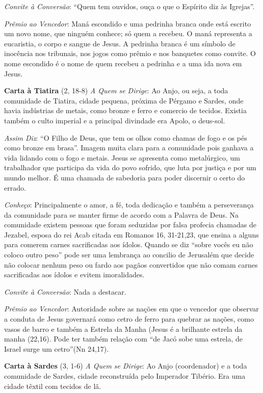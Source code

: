 \documentclass[
]{book}
\begin{document}
\emph{Convite à Conversão}: ``Quem tem ouvidos, ouça o que o Espírito diz às Igrejas''.

\emph{Prêmio ao Vencedor}: Maná escondido e uma pedrinha branca onde está escrito um novo nome, que ninguém conhece; só quem a recebeu. O maná representa a eucaristia, o corpo e sangue de Jesus. A pedrinha branca é um símbolo de inocência nos tribunais, nos jogos como prêmio e nos banquetes como convite. O nome escondido é o nome de quem recebeu a pedrinha e a uma ida nova em Jesus.

\textbf{Carta à Tiatira} (2, 18-8)
\emph{A Quem se Dirige}: Ao Anjo, ou seja, a toda comunidade de Tiatira, cidade pequena, próxima de Pérgamo e Sardes, onde havia indústrias de metais, como bronze e ferro e comercio de tecidos. Existia também o culto imperial e a principal divindade era Apolo, o deus-sol.

\emph{Assim Diz}: ``O Filho de Deus, que tem os olhos como chamas de fogo e os pés como bronze em brasa''. Imagem muita clara para a comunidade pois ganhava a vida lidando com o fogo e metais. Jesus se apresenta como metalúrgico, um trabalhador que participa da vida do povo sofrido, que luta por justiça e por um mundo melhor. É uma chamada de sabedoria para poder discernir o certo do errado.

\emph{Conheço}: Principalmente o amor, a fé, toda dedicação e também a perseverança da comunidade para se manter firme de acordo com a Palavra de Deus. Na comunidade existem pessoas que foram seduzidas por falsa profecia chamadas de Jezabel, esposa do rei Acab citada em Romanos 16, 31-21,23, que ensina a alguns para comerem carnes sacrificadas aos ídolos. Quando se diz ``sobre vocês eu não coloco outro peso'' pode ser uma lembrança ao concilio de Jerusalém que decide não colocar nenhum peso ou fardo aos pagãos convertidos que não comam carnes sacrificadas aos ídolos e evitem imoralidades.

\emph{Convite à Conversão}: Nada a destacar.

\emph{Prêmio ao Vencedor}: Autoridade sobre as nações em que o vencedor que observar a conduta de Jesus governará como cetro de ferro para quebrar as nações, como vasos de barro e também a Estrela da Manha (Jesus é a brilhante estrela da manha (22,16). Pode ter também relação com ``de Jacó sobe uma estrela, de Israel surge um cetro''(Nn 24,17).

\textbf{Carta à Sardes} (3, 1-6)
\emph{A Quem se Dirige}: Ao Anjo (coordenador) e a toda comunidade de Sardes, cidade reconstruída pelo Imperador Tibério. Era uma cidade têxtil com tecidos de lã.
\end{document}
